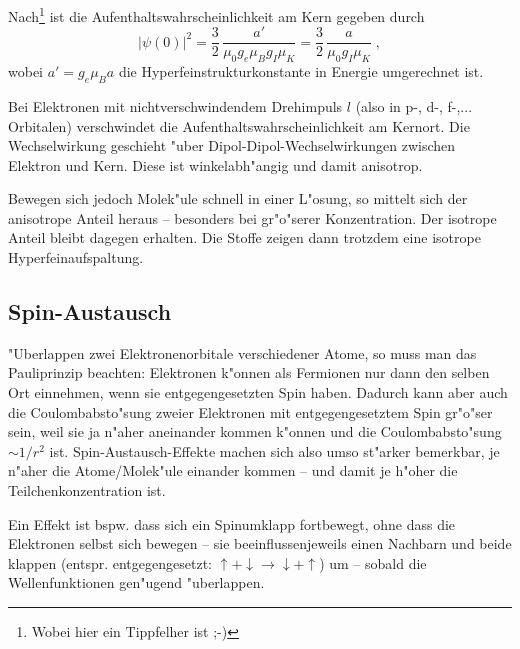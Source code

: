 \documentclass[a4paper,12pt]{article}
\begin{document}
Nach\footnote{Wobei hier ein Tippfelher ist ;-)}
\cite[Gl. 19.7]{hw_gross} ist die Aufenthaltswahrscheinlichkeit am
Kern gegeben durch
\begin{equation}
  \label{eq:17}
  | \psi(0) |^2 = 
\frac 3 2 \, \frac{ a' }{ \mu_0 g_e \mu_B g_I \mu_K }
= \frac 3 2 \, \frac{ a }{ \mu_0 g_I \mu_K }
\;,
\end{equation}
wobei $a' = g_e \mu_B a$ die Hyperfeinstrukturkonstante in Energie
umgerechnet ist.

Bei Elektronen mit nichtverschwindendem Drehimpuls $l$ (also in p-,
d-, f-,... Orbitalen) verschwindet die Aufenthaltswahrscheinlichkeit
am Kernort. Die Wechselwirkung geschieht "uber
Dipol-Dipol-Wechselwirkungen zwischen Elektron und Kern. Diese ist
winkelabh"angig und damit anisotrop.

Bewegen sich jedoch Molek"ule schnell in einer L"osung, so mittelt
sich der anisotrope Anteil heraus -- besonders bei gr"o"serer
Konzentration. Der isotrope Anteil bleibt dagegen erhalten. Die Stoffe
zeigen dann trotzdem eine isotrope Hyperfeinaufspaltung.



\subsection{Spin-Austausch}
\label{sec:spin_austausch}

"Uberlappen zwei Elektronenorbitale verschiedener Atome, so muss man
das Pauliprinzip beachten: Elektronen k"onnen als Fermionen nur dann den
selben Ort einnehmen, wenn sie entgegengesetzten Spin haben. Dadurch
kann aber auch die Coulombabsto"sung zweier Elektronen mit
entgegengesetztem Spin gr"o"ser sein, weil sie ja n"aher aneinander kommen k"onnen
und die Coulombabsto"sung $\sim 1/r^2$ ist. Spin-Austausch-Effekte
machen sich also umso st"arker bemerkbar, je n"aher die
Atome/Molek"ule einander kommen -- und damit je h"oher die
Teilchenkonzentration ist.

Ein Effekt ist bspw. dass sich ein Spinumklapp fortbewegt, ohne dass
die Elektronen selbst sich bewegen -- sie beeinflussenjeweils einen
Nachbarn und beide klappen (entspr. entgegengesetzt: $\uparrow +
\downarrow \to \downarrow + \uparrow$) um -- sobald die
Wellenfunktionen gen"ugend "uberlappen.
\end{document}
